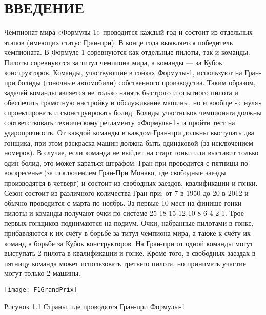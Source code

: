 \documentclass[14pt,a4paper]{extreport}
\begin{document}
	\newpage
	\section*{\center\normalsize ВВЕДЕНИЕ \endcenter}
	\flushleft\hspace{4ex} Чемпионат мира «Формулы-1» проводится каждый год и состоит из отдельных этапов (имеющих статус Гран-при). В конце года выявляется победитель чемпионата. В Формуле-1 соревнуются как отдельные пилоты, так и команды. Пилоты соревнуются за титул чемпиона мира, а команды — за Кубок конструкторов. Команды, участвующие в гонках Формулы-1, используют на Гран-при болиды (гоночные автомобили) собственного производства. Таким образом, задачей команды является не только нанять быстрого и опытного пилота и обеспечить грамотную настройку и обслуживание машины, но и вообще «с нуля» спроектировать и сконструировать болид. Болиды участников чемпионата должны соответствовать техническому регламенту «Формулы-1» и пройти тест на ударопрочность. От каждой команды в каждом Гран-при должны выступать два гонщика, при этом раскраска машин должна быть одинаковой (за исключением номеров). В случае, если команда не выйдет на старт гонки или выставит только один болид, это может караться штрафом. Гран-при проводится с пятницы по воскресенье (за исключением Гран-При Монако, где свободные заезды производятся в четверг) и состоит из свободных заездов, квалификации и гонки. Сезон состоит из различного количества Гран-при: от 7 в 1950 до 20 в 2012 и обычно проводится с марта по ноябрь. За первые 10 мест на финише гонки пилоты и команды получают очки по системе 25-18-15-12-10-8-6-4-2-1. Трое первых гонщиков поднимаются на подиум. Очки, набранные пилотами в гонке, прибавляются к их счёту в борьбе за титул чемпиона мира, а также к счёту их команд в борьбе за Кубок конструкторов. На Гран-при от одной команды могут выступать 2 пилота в квалификации и гонке. Кроме того, в свободных заездах в пятницу команда может использовать третьего пилота, но принимать участие могут только 2 машины.\par
	\center \texttt{[image: F1GrandPrix]}\par
	\center Рисунок 1.1 Страны, где проводятся Гран-при Формулы-1\par
	
\end{document}

